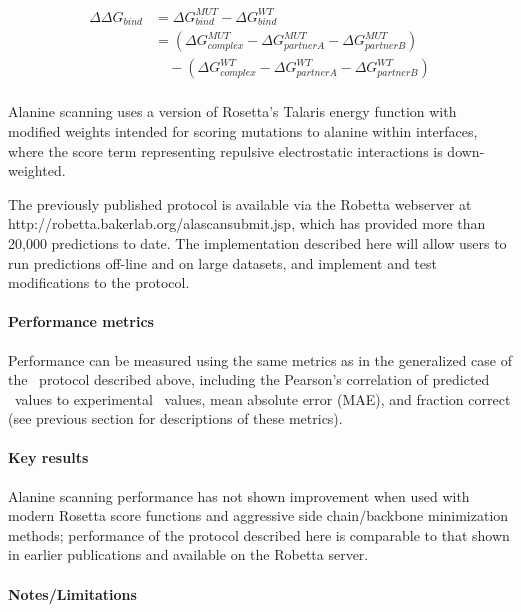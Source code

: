 \begin{equation}\label{eqn:split-ddg}
  \begin{split}
    {\Delta\Delta}G_{bind} & ={\Delta}G^{MUT}_{bind} - {\Delta}G^{WT}_{bind}\\
    & =({\Delta}G^{MUT}_{complex} - {\Delta}G^{MUT}_{partner A} - {\Delta}G^{MUT}_{partner B})\\
    & \quad - ({\Delta}G^{WT}_{complex} - {\Delta}G^{WT}_{partner A} - {\Delta}G^{WT}_{partner B})\\
  \end{split}
\end{equation}

Alanine scanning uses a version of Rosetta’s Talaris energy function with modified weights intended for scoring mutations to alanine within interfaces, where the score term representing repulsive electrostatic interactions is down-weighted.

The previously published protocol \cite{kortemme_simple_2002,kortemme_computational_2004} is available via the Robetta webserver at http://robetta.bakerlab.org/alascansubmit.jsp, which has provided more than 20,000 predictions to date. The implementation described here will allow users to run predictions off-line and on large datasets, and implement and test modifications to the protocol.

\paragraph{Performance metrics}

Performance can be measured using the same metrics as in the generalized case of the \ddg\ protocol described above, including the Pearson’s correlation of predicted \ddg\ values to experimental \ddg\ values, mean absolute error (MAE), and fraction correct (see previous section for descriptions of these metrics).

\paragraph{Key results}

Alanine scanning performance has not shown improvement when used with modern Rosetta score functions and aggressive side chain/backbone minimization methods; performance of the protocol described here is comparable to that shown in earlier publications \cite{kortemme_simple_2002,kortemme_computational_2004} and available on the Robetta server.

\paragraph{Notes/Limitations}

